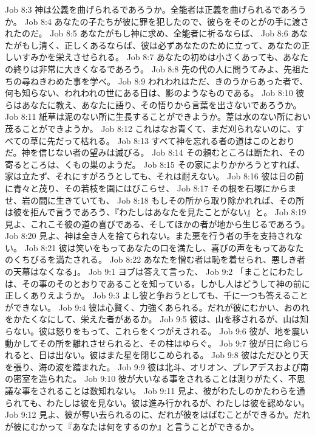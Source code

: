 Job 8:3  神は公義を曲げられるであろうか。全能者は正義を曲げられるであろうか。
Job 8:4  あなたの子たちが彼に罪を犯したので、彼らをそのとがの手に渡されたのだ。
Job 8:5  あなたがもし神に求め、全能者に祈るならば、
Job 8:6  あなたがもし清く、正しくあるならば、彼は必ずあなたのために立って、あなたの正しいすみかを栄えさせられる。
Job 8:7  あなたの初めは小さくあっても、あなたの終りは非常に大きくなるであろう。
Job 8:8  先の代の人に問うてみよ、先祖たちの尋ねきわめた事を学べ。
Job 8:9  われわれはただ、きのうからあった者で、何も知らない、われわれの世にある日は、影のようなものである。
Job 8:10  彼らはあなたに教え、あなたに語り、その悟りから言葉を出さないであろうか。
Job 8:11  紙草は泥のない所に生長することができようか。葦は水のない所におい茂ることができようか。
Job 8:12  これはなお青くて、まだ刈られないのに、すべての草に先だって枯れる。
Job 8:13  すべて神を忘れる者の道はこのとおりだ。神を信じない者の望みは滅びる。
Job 8:14  その頼むところは断たれ、その寄るところは、くもの巣のようだ。
Job 8:15  その家によりかかろうとすれば、家は立たず、それにすがろうとしても、それは耐えない。
Job 8:16  彼は日の前に青々と茂り、その若枝を園にはびこらせ、
Job 8:17  その根を石塚にからませ、岩の間に生きていても、
Job 8:18  もしその所から取り除かれれば、その所は彼を拒んで言うであろう、『わたしはあなたを見たことがない』と。
Job 8:19  見よ、これこそ彼の道の喜びである、そしてほかの者が地から生じるであろう。
Job 8:20  見よ、神は全き人を捨てられない。また悪を行う者の手を支持されない。
Job 8:21  彼は笑いをもってあなたの口を満たし、喜びの声をもってあなたのくちびるを満たされる。
Job 8:22  あなたを憎む者は恥を着せられ、悪しき者の天幕はなくなる」。
Job 9:1  ヨブは答えて言った、
Job 9:2  「まことにわたしは、その事のそのとおりであることを知っている。しかし人はどうして神の前に正しくありえようか。
Job 9:3  よし彼と争おうとしても、千に一つも答えることができない。
Job 9:4  彼は心賢く、力強くあられる。だれが彼にむかい、おのれをかたくなにして、栄えた者があるか。
Job 9:5  彼は、山を移されるが、山は知らない。彼は怒りをもって、これらをくつがえされる。
Job 9:6  彼が、地を震い動かしてその所を離れさせられると、その柱はゆらぐ。
Job 9:7  彼が日に命じられると、日は出ない。彼はまた星を閉じこめられる。
Job 9:8  彼はただひとり天を張り、海の波を踏まれた。
Job 9:9  彼は北斗、オリオン、プレアデスおよび南の密室を造られた。
Job 9:10  彼が大いなる事をされることは測りがたく、不思議な事をされることは数知れない。
Job 9:11  見よ、彼がわたしのかたわらを通られても、わたしは彼を見ない。彼は進み行かれるが、わたしは彼を認めない。
Job 9:12  見よ、彼が奪い去られるのに、だれが彼をはばむことができるか。だれが彼にむかって『あなたは何をするのか』と言うことができるか。
